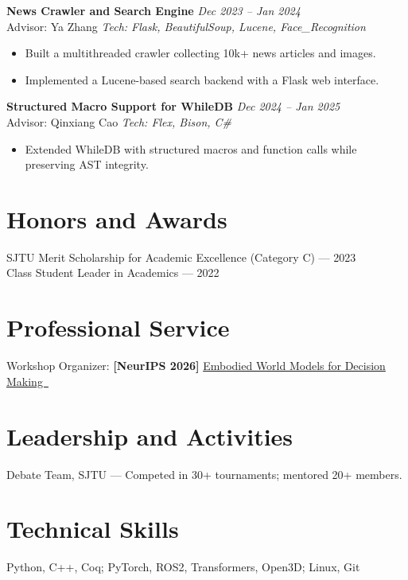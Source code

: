 \documentclass{chicv}
\begin{document}
\textbf{News Crawler and Search Engine} \hfill \textit{Dec 2023 -- Jan 2024} \\
Advisor: Ya Zhang \hfill \textit{Tech: Flask, BeautifulSoup, Lucene, Face\_Recognition}
\begin{itemize}[noitemsep, topsep=0pt]
    \item Built a multithreaded crawler collecting 10k+ news articles and images.
    \item Implemented a Lucene-based search backend with a Flask web interface.
\end{itemize}

\textbf{Structured Macro Support for WhileDB} \hfill \textit{Dec 2024 -- Jan 2025} \\
Advisor: Qinxiang Cao \hfill \textit{Tech: Flex, Bison, C\#} 
\begin{itemize}[noitemsep, topsep=0pt]
    \item Extended WhileDB with structured macros and function calls while preserving AST integrity.
\end{itemize}

\section*{Honors and Awards}
SJTU Merit Scholarship for Academic Excellence (Category C) — 2023 \\
Class Student Leader in Academics — 2022

\section*{Professional Service}
Workshop Organizer: \textbf{[NeurIPS 2026]}
\href{https://embodied-world-models.github.io/#assistance}{Embodied World Models for Decision Making\ {\scalebox{0.6}{\faExternalLink*}}}



\section*{Leadership and Activities}
Debate Team, SJTU — Competed in 30+ tournaments; mentored 20+ members.

\section*{Technical Skills}
Python, C++, Coq; PyTorch, ROS2, Transformers, Open3D; Linux, Git
\end{document}
